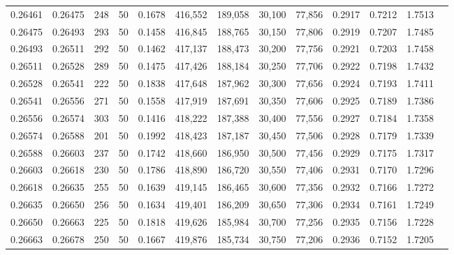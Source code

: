 \begin{tabular}{rrrrrrrrrrrrr}
0.26461 & 0.26475 &   248 &  50 &                                     0.1678 & 416,552 & 189,058 &  30,100 &  77,856 & 0.2917 & 0.7212 & 1.7513 \\
0.26475 & 0.26493 &   293 &  50 &                                     0.1458 & 416,845 & 188,765 &  30,150 &  77,806 & 0.2919 & 0.7207 & 1.7485 \\
0.26493 & 0.26511 &   292 &  50 &                                     0.1462 & 417,137 & 188,473 &  30,200 &  77,756 & 0.2921 & 0.7203 & 1.7458 \\
0.26511 & 0.26528 &   289 &  50 &                                     0.1475 & 417,426 & 188,184 &  30,250 &  77,706 & 0.2922 & 0.7198 & 1.7432 \\
0.26528 & 0.26541 &   222 &  50 &                                     0.1838 & 417,648 & 187,962 &  30,300 &  77,656 & 0.2924 & 0.7193 & 1.7411 \\
0.26541 & 0.26556 &   271 &  50 &                                     0.1558 & 417,919 & 187,691 &  30,350 &  77,606 & 0.2925 & 0.7189 & 1.7386 \\
0.26556 & 0.26574 &   303 &  50 &                                     0.1416 & 418,222 & 187,388 &  30,400 &  77,556 & 0.2927 & 0.7184 & 1.7358 \\
0.26574 & 0.26588 &   201 &  50 &                                     0.1992 & 418,423 & 187,187 &  30,450 &  77,506 & 0.2928 & 0.7179 & 1.7339 \\
0.26588 & 0.26603 &   237 &  50 &                                     0.1742 & 418,660 & 186,950 &  30,500 &  77,456 & 0.2929 & 0.7175 & 1.7317 \\
0.26603 & 0.26618 &   230 &  50 &                                     0.1786 & 418,890 & 186,720 &  30,550 &  77,406 & 0.2931 & 0.7170 & 1.7296 \\
0.26618 & 0.26635 &   255 &  50 &                                     0.1639 & 419,145 & 186,465 &  30,600 &  77,356 & 0.2932 & 0.7166 & 1.7272 \\
0.26635 & 0.26650 &   256 &  50 &                                     0.1634 & 419,401 & 186,209 &  30,650 &  77,306 & 0.2934 & 0.7161 & 1.7249 \\
0.26650 & 0.26663 &   225 &  50 &                                     0.1818 & 419,626 & 185,984 &  30,700 &  77,256 & 0.2935 & 0.7156 & 1.7228 \\
0.26663 & 0.26678 &   250 &  50 &                                     0.1667 & 419,876 & 185,734 &  30,750 &  77,206 & 0.2936 & 0.7152 & 1.7205 \\

\end{tabular}
